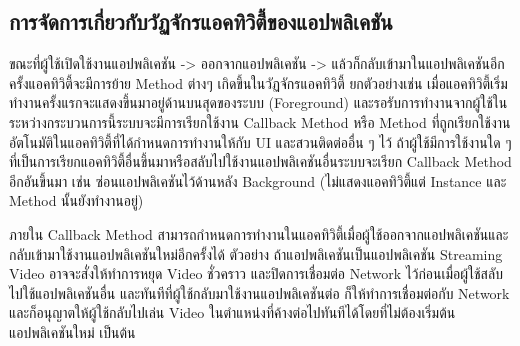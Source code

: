 %	
%	
	
	\subsection{การจัดการเกี่ยวกับวัฏจักรแอคทิวิตี้ของแอปพลิเคชัน}
	
	ขณะที่ผู้ใช้เปิดใช้งานแอปพลิเคชัน -> ออกจากแอปพลิเคชัน -> แล้วก็กลับเข้ามาในแอปพลิเคชันอีกครั้งแอคทิวิตี้จะมีการย้าย Method ต่างๆ เกิดขึ้นในวัฏจักรแอคทิวิตี้ ยกตัวอย่างเช่น 
	เมื่อแอคทิวิตี้เริ่มทำงานครั้งแรกจะแสดงขึ้นมาอยู่ด้านบนสุดของระบบ (Foreground) และรอรับการทำงานจากผู้ใช้ในระหว่างกระบวนการนี้ระบบจะมีการเรียกใช้งาน Callback Method หรือ Method ที่ถูกเรียกใช้งานอัตโนมัติในแอคทิวิตี้ที่ได้กำหนดการทำงานให้กับ UI และสวนติดต่ออื่น ๆ ไว้ ถ้าผู้ใช้มีการใช้งานใด ๆ ที่เป็นการเรียกแอคทิวิตี้อื่นขึ้นมาหรือสลับไปใช้งานแอปพลิเคชันอื่นระบบจะเรียก Callback Method อีกอันขึ้นมา เช่น ซ่อนแอปพลิเคชันไว้ด้านหลัง Background (ไม่แสดงแอคทิวิตี้แต่ Instance และ Method นั้นยังทำงานอยู่)
	
	ภายใน Callback Method สามารถกำหนดการทำงานในแอคทิวิตี้เมื่อผู้ใช้ออกจากแอปพลิเคชันและกลับเข้ามาใช้งานแอปพลิเคชันใหม่อีกครั้งได้ ตัวอย่าง ถ้าแอปพลิเคชันเป็นแอปพลิเคชัน Streaming Video
	อาจจะสั่งให้ทำการหยุด Video ชั่วคราว และปิดการเชื่อมต่อ Network ไว้ก่อนเมื่อผู้ใช้สลับไปใช้แอปพลิเคชันอื่น
	และทันทีที่ผู้ใช้กลับมาใช้งานแอปพลิเคชันต่อ ก็ให้ทำการเชื่อมต่อกับ Network และก็อนุญาตให้ผู้ใช้กลับไปเล่น Video
	ในตำแหน่งที่ค้างต่อไปทันทีได้โดยที่ไม่ต้องเริ่มต้นแอปพลิเคชันใหม่ เป็นต้น
	
